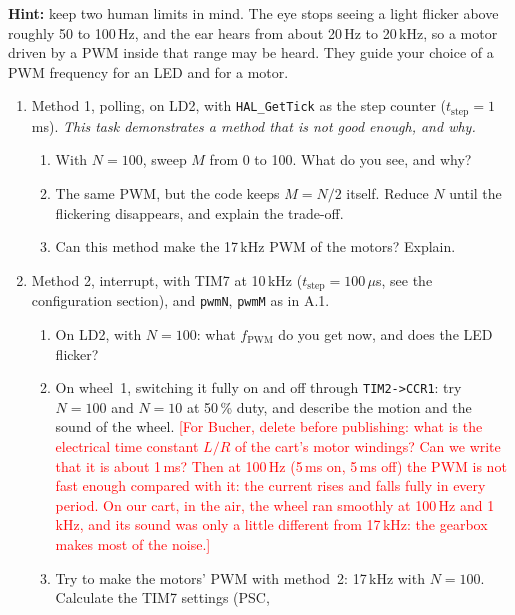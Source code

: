 \documentclass[11pt,a4paper]{article}
\newcommand{\flag}[1]{\textcolor{red}{[#1]}}
\begin{document}
\smallskip\noindent
\textbf{Hint:} keep two human limits in mind. The eye stops seeing a light flicker above roughly 50 to 100\,Hz, and the
ear hears from about 20\,Hz to 20\,kHz, so a motor driven by a PWM inside that range may be heard. They guide
your choice of a PWM frequency for an LED and for a motor.
\begin{enumerate}[label=A.\arabic*, leftmargin=2.2em]
  \item Method 1, polling, on LD2, with \texttt{HAL\_GetTick} as the step counter ($t_\mathrm{step} = 1$\,ms).
        \emph{This task demonstrates a method that is not good enough, and why.}
        \begin{enumerate}[label=A.1.\arabic*, leftmargin=3.2em]
          \item With $N = 100$, sweep $M$ from 0 to 100. What do you see, and why?
          \item The same PWM, but the code keeps $M = N/2$ itself. Reduce $N$ until the flickering disappears, and
                explain the trade-off.
          \item Can this method make the 17\,kHz PWM of the motors? Explain.
        \end{enumerate}
  \item Method 2, interrupt, with TIM7 at 10\,kHz ($t_\mathrm{step} = 100\,\mu$s, see the configuration section), and
        \texttt{pwmN}, \texttt{pwmM} as in A.1.
        \begin{enumerate}[label=A.2.\arabic*, leftmargin=3.2em]
          \item On LD2, with $N = 100$: what $f_\mathrm{PWM}$ do you get now, and does the LED flicker?
          \item On wheel~1, switching it fully on and off through \texttt{TIM2->CCR1}: try $N = 100$ and $N = 10$ at
                50\,\% duty, and describe the motion and the sound of the wheel.
                \flag{For Bucher, delete before publishing: what is the electrical time constant $L/R$ of the cart's
                motor windings? Can we write that it is about 1\,ms? Then at 100\,Hz (5\,ms on, 5\,ms off) the PWM is not fast enough compared with it: the current rises and
                falls fully in every period. On our cart, in the air, the wheel ran smoothly at 100\,Hz and 1\,kHz,
                and its sound was only a little different from 17\,kHz: the gearbox makes most of the noise.}
          \item Try to make the motors' PWM with method~2: 17\,kHz with $N = 100$. Calculate the TIM7 settings (PSC,

\end{enumerate}
\end{enumerate}
\end{document}
